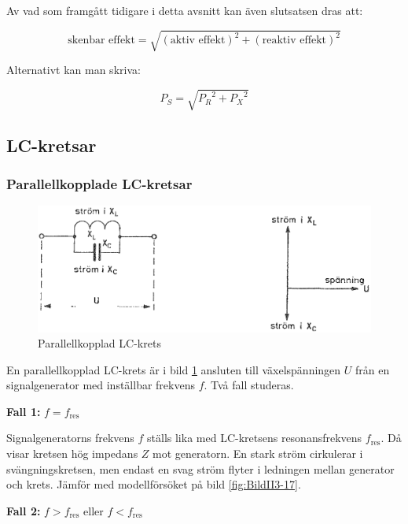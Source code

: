 Av vad som framgått tidigare i detta avsnitt kan även slutsatsen dras att:

\[
\text{skenbar effekt} = \sqrt{(\text{aktiv effekt})^2 + (\text{reaktiv effekt})^2}
\]

Alternativt kan man skriva:

\[ P_S = \sqrt{{P_R}^2+{P_X}^2} \]

\subsection{LC-kretsar}

\subsubsection{Parallellkopplade LC-kretsar}

\begin{figure}
\includegraphics[width=\textwidth]{images/cropped_pdfs/bild_2_3-15.pdf}
\caption{Parallellkopplad LC-krets}
\label{fig:BildII3-15}
\end{figure}

En parallellkopplad LC-krets är i bild \ref{fig:BildII3-15} ansluten till
växelspänningen \(U\) från en signalgenerator med inställbar frekvens \(f\).
Två fall studeras.

\noindent \textbf{Fall 1:} \(f = f_\text{{res}}\)

Signalgeneratorns frekvens \(f\) ställs lika med LC-kretsens resonansfrekvens
\(f_\text{{res}}\).
Då visar kretsen hög impedans \(Z\) mot generatorn.
En stark ström cirkulerar i svängningskretsen, men endast en svag ström flyter
i ledningen mellan generator och krets.
Jämför med modellförsöket på bild \ref{fig:BildII3-17}.

\noindent \textbf{Fall 2:} \(f > f_\text{{res}}\) eller \(f < f_\text{{res}}\)

